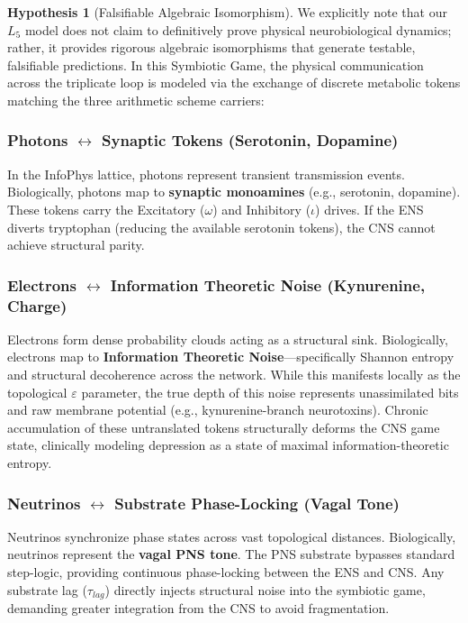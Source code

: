 \documentclass[12pt,oneside]{article}
\theoremstyle{principia}
\theoremstyle{definition}
\newtheorem{hypothesis}[theorem]{Hypothesis}
\theoremstyle{remark}
\begin{document}
\begin{hypothesis}[Falsifiable Algebraic Isomorphism]
We explicitly note that our $L_5$ model does not claim to definitively prove physical neurobiological dynamics; rather, it provides rigorous algebraic isomorphisms that generate testable, falsifiable predictions. In this Symbiotic Game, the physical communication across the triplicate loop is modeled via the exchange of discrete metabolic tokens matching the three arithmetic scheme carriers:

\subsubsection*{Photons \texorpdfstring{$\leftrightarrow$}{\textleftrightarrow} Synaptic Tokens (Serotonin, Dopamine)}
In the InfoPhys lattice, photons represent transient transmission events. Biologically, photons map to \textbf{synaptic monoamines} (e.g., serotonin, dopamine). These tokens carry the Excitatory ($\omega$) and Inhibitory ($\iota$) drives. If the ENS diverts tryptophan (reducing the available serotonin tokens), the CNS cannot achieve structural parity.

\subsubsection*{Electrons \texorpdfstring{$\leftrightarrow$}{\textleftrightarrow} Information Theoretic Noise (Kynurenine, Charge)}
Electrons form dense probability clouds acting as a structural sink. Biologically, electrons map to \textbf{Information Theoretic Noise}---specifically Shannon entropy and structural decoherence across the network. While this manifests locally as the topological $\varepsilon$ parameter, the true depth of this noise represents unassimilated bits and raw membrane potential (e.g., kynurenine-branch neurotoxins). Chronic accumulation of these untranslated tokens structurally deforms the CNS game state, clinically modeling depression as a state of maximal information-theoretic entropy.

\subsubsection*{Neutrinos \texorpdfstring{$\leftrightarrow$}{\textleftrightarrow} Substrate Phase-Locking (Vagal Tone)}
Neutrinos synchronize phase states across vast topological distances. Biologically, neutrinos represent the \textbf{vagal PNS tone}. The PNS substrate bypasses standard step-logic, providing continuous phase-locking between the ENS and CNS. Any substrate lag ($\tau_{lag}$) directly injects structural noise into the symbiotic game, demanding greater integration from the CNS to avoid fragmentation.


\end{hypothesis}
\end{document}
